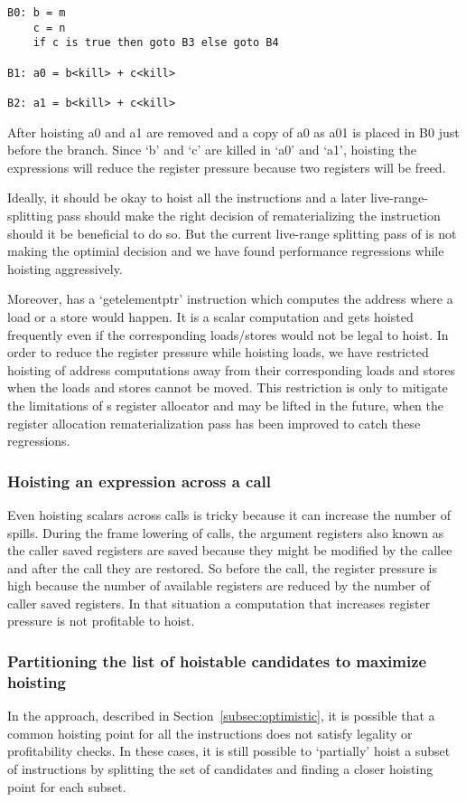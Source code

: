 \documentclass[acmlarge,review,anonymous]{acmart}\settopmatter{printfolios=true}
\begin{document}
\begin{verbatim}
B0: b = m
    c = n
    if c is true then goto B3 else goto B4

B1: a0 = b<kill> + c<kill>

B2: a1 = b<kill> + c<kill>
\end{verbatim}

After hoisting a0 and a1 are removed and a copy of a0 as a01 is placed in B0
just before the branch. Since `b' and `c' are killed in `a0' and `a1', hoisting
the expressions will reduce the register pressure because two registers will be
freed.

Ideally, it should be okay to hoist all the instructions and a later
live-range-splitting \cite{cooper1998live} pass should make the right decision
of rematerializing the instruction should it be beneficial to do so. But the
current live-range splitting pass of \LLVM{} is not making the optimial decision
and we have found performance regressions while hoisting aggressively.

Moreover, \LLVM{} has a `getelementptr' instruction which computes the address
where a load or a store would happen. It is a scalar computation and gets
hoisted frequently even if the corresponding loads/stores would not be legal to
hoist.  In order to reduce the register pressure while hoisting loads, we have
restricted hoisting of address computations away from their corresponding loads
and stores when the loads and stores cannot be moved. This restriction is only
to mitigate the limitations of s register allocator and may be lifted in
the future, when the register allocation rematerialization pass has been
improved to catch these regressions.

\subsubsection{Hoisting an expression across a call}
\label{cost:across-calls}
Even hoisting scalars across calls is tricky because it can increase the number
of spills. During the frame lowering of calls, the argument registers also known
as the caller saved registers are saved because they might be modified by the
callee and after the call they are restored. So before the call, the register
pressure is high because the number of available registers are reduced by the
number of caller saved registers. In that situation a computation that increases
register pressure is not profitable to hoist.

\subsubsection{Partitioning the list of hoistable candidates to maximize hoisting}
\label{subsec:partition}
In the approach, described in Section~\ref{subsec:optimistic}, it is possible
that a common hoisting point for all the instructions does not satisfy legality
or profitability checks. In these cases, it is still possible to `partially'
hoist a subset of instructions by splitting the set of candidates and finding a
closer hoisting point for each subset.
\end{document}
